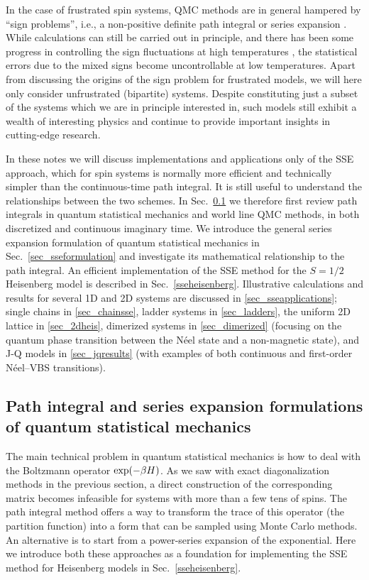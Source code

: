 \documentclass[draft,numberedheadings]{aipproc}
\begin{document}
In the case of frustrated spin systems, QMC methods are in general hampered by ``sign problems'', i.e., a non-positive definite path 
integral or series expansion \cite{henelius00}. While calculations can still be carried out in principle, and there has been some progress in controlling 
the sign fluctuations at high temperatures \cite{nyfeler08}, the statistical errors due to the mixed signs become uncontrollable at low temperatures. Apart 
from discussing the origins of the sign problem for frustrated models, we will here only consider unfrustrated (bipartite) systems. Despite constituting 
just a subset of the systems which we are in principle interested in, such models still exhibit a wealth of interesting physics and 
continue to provide important insights in cutting-edge research.

In these notes we will discuss implementations and applications only of the SSE approach, which for spin systems is normally more efficient and technically 
simpler than the continuous-time path integral. It is still useful to understand the relationships between the two schemes. In Sec.~\ref{sec_pathintegrals} 
we therefore first review path integrals in quantum statistical mechanics and world line QMC methods, in both discretized and continuous imaginary 
time. We introduce the general series expansion formulation of quantum statistical mechanics in Sec.~\ref{sec_sseformulation} and investigate its 
mathematical relationship to the path integral. An efficient implementation of the SSE method for the $S=1/2$ Heisenberg model is described in 
Sec.~\ref{sseheisenberg}. Illustrative calculations and results for several 1D and 2D systems are discussed in \ref{sec_sseapplications}; single
chains in \ref{sec_chainsse}, ladder systems in \ref{sec_ladders}, the uniform 2D lattice in \ref{sec_2dheis}, dimerized systems in \ref{sec_dimerized}
(focusing on the quantum phase transition between the N\'eel state and a non-magnetic state), and J-Q models in \ref{sec_jqresults} (with examples
of both continuous and first-order N\'eel--VBS transitions).

\subsection{Path integral and series expansion formulations \\ of quantum statistical mechanics}
\label{sec_pathintegrals}

The main technical problem in quantum statistical mechanics is how to deal with the Boltzmann operator ${\rm exp}({-\beta H})$. As we saw with exact
diagonalization methods in the previous section, a direct construction of the corresponding matrix becomes infeasible for systems with more than a 
few tens of spins. The path integral method
offers a way to transform the trace of this operator (the partition function) into a form that can be sampled using Monte Carlo methods. An alternative
is to start from a power-series expansion of the exponential. Here we introduce both these approaches as a foundation for implementing the SSE
method for Heisenberg models in Sec.~\ref{sseheisenberg}.
\end{document}
